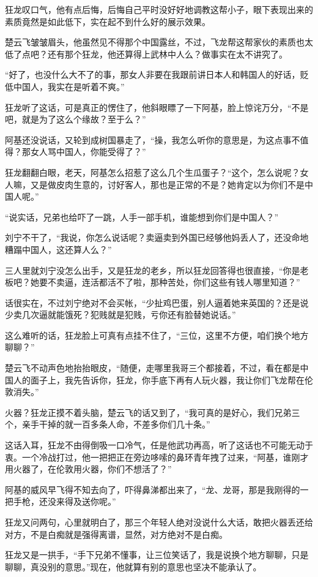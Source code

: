 狂龙叹口气，他有点后悔，后悔自己平时没好好地调教这帮小子，眼下表现出来的素质竟然是如此低下，实在起不到什么好的展示效果。

楚云飞皱皱眉头，他虽然见不得那个中国露丝，不过，飞龙帮这帮家伙的素质也太低了点吧？还有那个狂龙，他还算得上武林中人么？做事实在太不讲究了。

“好了，也没什么大不了的事，那女人非要在我跟前讲日本人和韩国人的好话，贬低中国人，我实在是听着不爽。”

狂龙听了这话，可是真正的愣住了，他斜眼瞟了一下阿基，脸上惊诧万分，“不是吧，就是为了这么个缘故？至于么？”

阿基还没说话，又轮到成树国暴走了，“操，我怎么听你的意思是，为这点事不值得？那女人骂中国人，你能受得了？”

狂龙翻翻白眼，老天，阿基怎么招惹了这么几个生瓜蛋子？“这个，怎么说呢？女人嘛，又是做皮肉生意的，讨好客人，那也是正常的不是？她肯定以为你们不是中国人呢。”

“说实话，兄弟也给吓了一跳，人手一部手机，谁能想到你们是中国人？”

刘宁不干了，“我说，你怎么说话呢？卖逼卖到外国已经够他妈丢人了，还没命地糟蹋中国人，这还算人么？”

三人里就刘宁没怎么出手，又是狂龙的老乡，所以狂龙回答得也很直接，“你是老板吧？她要不卖逼，连活都活不了啦，那种苦处，你们这些有钱人哪里知道？”

话很实在，不过刘宁绝对不会买帐，“少扯鸡巴蛋，别人逼着她来英国的？还是说少卖几次逼就能饿死？犯贱就是犯贱，亏你还有脸替她说话。”

这么难听的话，狂龙脸上可真有点挂不住了，“三位，这里不方便，咱们换个地方聊聊？”

楚云飞不动声色地抬抬眼皮，“随便，走哪里我哥三个都接着，不过，看在都是中国人的面子上，我先告诉你，狂龙，你手底下再有人玩火器，我让你们飞龙帮在伦敦消失。”

火器？狂龙正摸不着头脑，楚云飞的话又到了，“我可真的是好心，我们兄弟三个，亲手干掉的就一百多条人命，不差多你们几十条。”

这话入耳，狂龙不由得倒吸一口冷气，任是他武功再高，听了这话也不可能无动于衷。一个冷战打过，他一把把正在旁边哆嗦的鼻环青年拽了过来，“阿基，谁刚才用火器了，在伦敦用火器，你们不想活了？”

阿基的威风早飞得不知去向了，吓得鼻涕都出来了，“龙、龙哥，那是我刚得的一把手枪，还没来得及送你呢。”

狂龙又问两句，心里就明白了，那三个年轻人绝对没说什么大话，敢把火器丢还给对方，不是白痴就是强得离谱，显然，对方绝对不是白痴。

狂龙又是一拱手，“手下兄弟不懂事，让三位笑话了，我是说换个地方聊聊，只是聊聊，真没别的意思。”现在，他就算有别的意思也坚决不能承认了。

